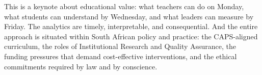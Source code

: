 This is a keynote about educational value: what teachers can do on Monday, what students can understand by Wednesday, and what leaders can measure by Friday. The analytics are timely, interpretable, and consequential. And the entire approach is situated within South African policy and practice: the CAPS-aligned curriculum, the roles of Institutional Research and Quality Assurance, the funding pressures that demand cost-effective interventions, and the ethical commitments required by law and by conscience.

